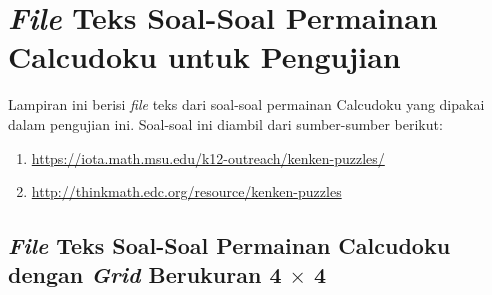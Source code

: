 \chapter{\textit{File} Teks Soal-Soal Permainan Calcudoku untuk Pengujian}
\label{chap:soalsoal}

Lampiran ini berisi \textit{file} teks dari soal-soal permainan Calcudoku yang dipakai dalam pengujian ini. Soal-soal ini diambil dari sumber-sumber berikut:

\begin{enumerate}
\item \url{https://iota.math.msu.edu/k12-outreach/kenken-puzzles/}
\item \url{http://thinkmath.edc.org/resource/kenken-puzzles}
\end{enumerate}

\singlespacing

\section{\textit{File} Teks Soal-Soal Permainan Calcudoku dengan \textit{Grid} Berukuran 4 $\times$ 4}
\label{sec:soalsoal4x4}

